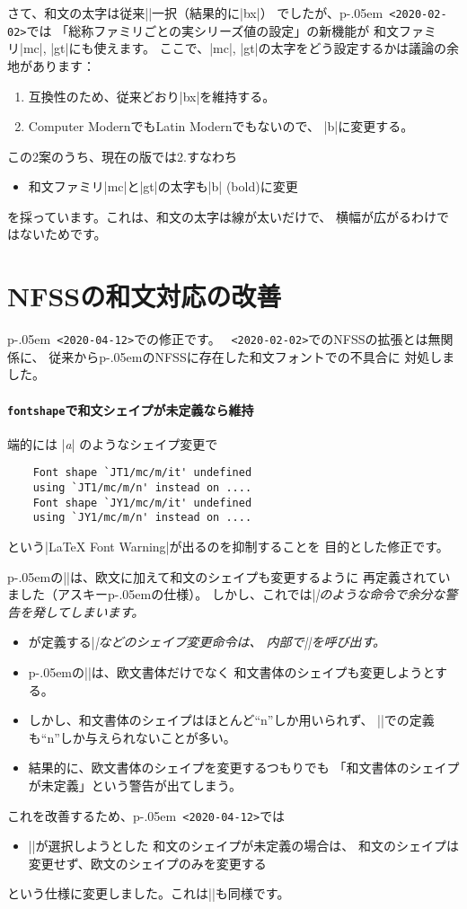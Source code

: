 \documentclass{plnews}
\def\cs#1{\texttt{\char92\nobreak #1}}
\def\pLaTeXe{p\kern-.05em\LaTeXe}
\begin{document}
さて、和文の太字は従来|\bfdefault|一択（結果的に|bx|）
でしたが、\pLaTeXe\ \texttt{<2020-02-02>}では
「総称ファミリごとの実シリーズ値の設定」の新機能が
和文ファミリ|mc|, |gt|にも使えます。
ここで、|mc|, |gt|の太字をどう設定するかは議論の余地があります：
\begin{enumerate}
 \item 互換性のため、従来どおり|bx|を維持する。
 \item Computer ModernでもLatin Modernでもないので、
   |b|に変更する。
\end{enumerate}
この2案のうち、現在の版では2.すなわち
\begin{itemize}
 \item 和文ファミリ|mc|と|gt|の太字も|b| (bold)に変更
\end{itemize}
を採っています。これは、和文の太字は線が太いだけで、
横幅が広がるわけではないためです。


\section{NFSSの和文対応の改善}
\pLaTeXe\ \texttt{<2020-04-12>}での修正です。
\LaTeXe\ \texttt{<2020-02-02>}でのNFSSの拡張とは無関係に、
従来から\pLaTeXe{}のNFSSに存在した和文フォントでの不具合に
対処しました。

\paragraph{\cs{fontshape}で和文シェイプが未定義なら維持}
端的には |{\itshape a}| のようなシェイプ変更で
\begin{verbatim}
    Font shape `JT1/mc/m/it' undefined
    using `JT1/mc/m/n' instead on ....
    Font shape `JY1/mc/m/it' undefined
    using `JY1/mc/m/n' instead on ....
\end{verbatim}
という|LaTeX Font Warning|が出るのを抑制することを
目的とした修正です。

\pLaTeXe{}の|\fontshape|は、欧文に加えて和文のシェイプも変更するように
再定義されていました（アスキー\pLaTeXe{}の仕様）。
しかし、これでは|\itshape|のような命令で余分な警告を発してしまいます。
\begin{itemize}
 \item \LaTeXe{}が定義する|\itshape|などのシェイプ変更命令は、
   内部で|\fontshape|を呼び出す。
 \item \pLaTeXe{}の|\fontshape|は、欧文書体だけでなく
   和文書体のシェイプも変更しようとする。
 \item しかし、和文書体のシェイプはほとんど``n''しか用いられず、
   |\DeclareFontShape|での定義も``n''しか与えられないことが多い。
 \item 結果的に、欧文書体のシェイプを変更するつもりでも
   「和文書体のシェイプが未定義」という警告が出てしまう。
\end{itemize}
これを改善するため、\pLaTeXe\ \texttt{<2020-04-12>}では
\begin{itemize}
 \item |\fontshape|が選択しようとした
   和文のシェイプが未定義の場合は、
   和文のシェイプは変更せず、欧文のシェイプのみを変更する
\end{itemize}
という仕様に変更しました。これは|\fontshapeforce|も同様です。
\end{document}
